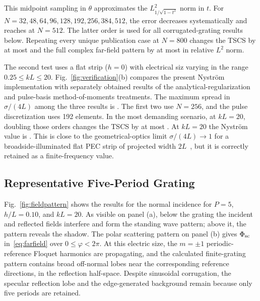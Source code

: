 \documentclass[conference]{IEEEtran}
\begin{document}
This midpoint sampling in $\theta$ approximates the
$L^2_{1/\sqrt{1-t^2}}$ norm in $t$.  For
$N=32,48,64,96,128,192,256,384,512$, the error decreases systematically and
reaches \ConvErrorNFiveTwelve at $N=512$.  The latter order is used for all
corrugated-grating results below.  Repeating every unique publication case at
$N=800$ changes the TSCS by at most \ProductionMaxTSCSChange and the full
complex far-field pattern by at most \ProductionMaxPatternChange in relative
$L^2$ norm.

The second test uses a flat strip ($h=0$) with electrical siz varying in the range
$0.25\leq kL\leq20$.  Fig.~\ref{fig:verification}(b) compares the present
Nystr\"om implementation with separately obtained results of the
analytical-regularization and pulse-basis method-of-moments treatments.  The
maximum spread in $\sigma/(4L)$ among the three results is \BackendMaxDiff.
The first two use $N=256$, and the pulse discretization uses 192 elements.
In the most demanding scenario, at $kL=20$, doubling those orders changes the
TSCS by at most \FlatOrderDoublingMaxChange.
At $kL=20$ the Nystr\"om value is
\FlatTSCSRatioTwenty.  This is close to the geometrical-optics limit
$\sigma/(4L)\to1$ for a broadside-illuminated flat PEC strip of projected
width $2L$~\cite{shapoval2011}, but it is correctly retained as a
finite-frequency value.

\subsection{Representative Five-Period Grating}

Fig.~\ref{fig:fieldpattern} shows the results for the normal incidence for
$P=5$, $h/L=0.10$, and $kL=20$.  As visible on panel (a), below the grating the 
incident and reflected fields interfere and form the standing wave pattern; above it, 
the pattern reveals the shadow.  The polar scattering pattern on panel (b) gives
$\Phi_{\rm sc}$ in~\eqref{eq:farfield} over $0\leq\varphi<2\pi$.  At this
electric size, the $m=\pm1$ periodic-reference Floquet
harmonics are propagating, and the calculated finite-grating pattern contains
broad off-normal lobes near the corresponding reference directions, in the 
reflection half-space. Despite sinusoidal corrugation, the specular
reflection lobe and the edge-generated background remain because only five
periods are retained.

\enlargethispage{-1.25in}
\end{document}
